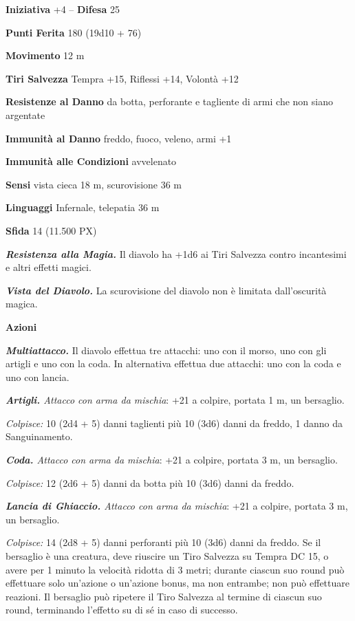 \begin{multicols}{2}
\textbf{Iniziativa} +4 -- \textbf{Difesa} 25

\textbf{Punti Ferita} 180 (19d10 + 76)

\textbf{Movimento} 12 m

\textbf{Tiri Salvezza} Tempra +15, Riflessi +14, Volontà +12

\textbf{Resistenze al Danno} da botta, perforante e tagliente di armi che non siano argentate

\textbf{Immunità al Danno} freddo, fuoco, veleno, armi +1

\textbf{Immunità alle Condizioni} avvelenato

\textbf{Sensi} vista cieca 18 m, scurovisione 36 m

\textbf{Linguaggi} Infernale, telepatia 36 m

\textbf{Sfida} 14 (11.500 PX)

\textit{\textbf{Resistenza alla Magia.}} Il diavolo ha +1d6 ai Tiri Salvezza contro incantesimi e altri effetti magici.

\textit{\textbf{Vista del Diavolo.}} La scurovisione del diavolo non è limitata dall'oscurità magica.

\textbf{Azioni}

\textit{\textbf{Multiattacco.}} Il diavolo effettua tre attacchi: uno con il morso, uno con gli artigli e uno con la coda. In alternativa effettua due attacchi: uno con la coda e uno con lancia.

\textit{\textbf{Artigli.} Attacco con arma da mischia}: +21 a colpire, portata 1 m, un bersaglio.

\textit{Colpisce:} 10 (2d4 + 5) danni taglienti più 10 (3d6) danni da freddo, 1 danno da Sanguinamento.

\textit{\textbf{Coda.} Attacco con arma da mischia}: +21 a colpire, portata 3 m, un bersaglio.

\textit{Colpisce:} 12 (2d6 + 5) danni da botta più 10 (3d6) danni da freddo.

\textit{\textbf{Lancia di Ghiaccio.} Attacco con arma da mischia}: +21 a colpire, portata 3 m, un bersaglio.

\textit{Colpisce:} 14 (2d8 + 5) danni perforanti più 10 (3d6) danni da freddo. Se il bersaglio è una creatura, deve riuscire un Tiro Salvezza su Tempra DC 15, o avere per 1 minuto la velocità ridotta di 3 metri; durante ciascun suo round può effettuare solo un'azione o un'azione bonus, ma non entrambe; non può effettuare reazioni. Il bersaglio può ripetere il Tiro Salvezza al termine di ciascun suo round, terminando l'effetto su di sé in caso di successo.


\end{multicols}
